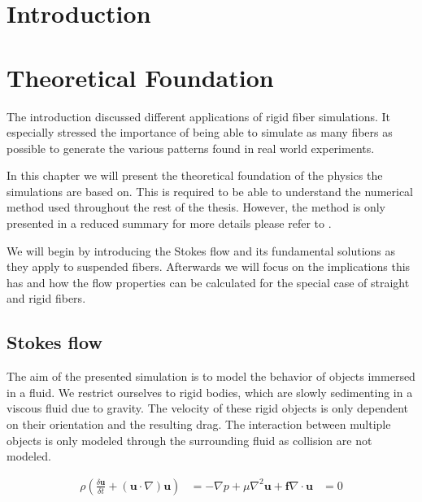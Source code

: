 \documentclass[a4paper,11pt]{kth-mag}
\begin{document}
\clearpage

\listoflistings

\mainmatter
\pagestyle{newchap}

\chapter{Introduction}

\chapter{Theoretical Foundation}
\label{cha:theoretical_foundation}
The introduction discussed different applications of rigid fiber simulations. It especially stressed the importance of being able to simulate as many fibers as possible to generate the various patterns found in real world experiments.

In this chapter we will present the theoretical foundation of the physics the simulations are based on. This is required to be able to understand the numerical method used throughout the rest of the thesis. However, the method is only presented in a reduced summary for more details please refer to \cite{}.

We will begin by introducing the Stokes flow and its fundamental solutions as they apply to suspended fibers. Afterwards we will focus on the implications this has and how the flow properties can be calculated for the special case of straight and rigid fibers.

\section{Stokes flow}

The aim of the presented simulation is to model the behavior of objects immersed in a fluid. We restrict ourselves to rigid bodies, which are slowly sedimenting in a viscous fluid due to gravity. The velocity of these rigid objects is only dependent on their orientation and the resulting drag. The interaction between multiple objects is only modeled through the surrounding fluid as collision are not modeled.

\begin{equation}
  \label{eq:naviar_stokes_equations}
  \begin{aligned}
    \rho(\frac{\delta \mathbf{u}}{\delta t} + (\mathbf{u} \cdot \nabla)\mathbf{u}) &= -\nabla p + \mu\nabla^2\mathbf{u} + \mathbf{f}
    \nabla \cdot \mathbf{u} &= 0
  \end{aligned}
\end{equation}
\end{document}
